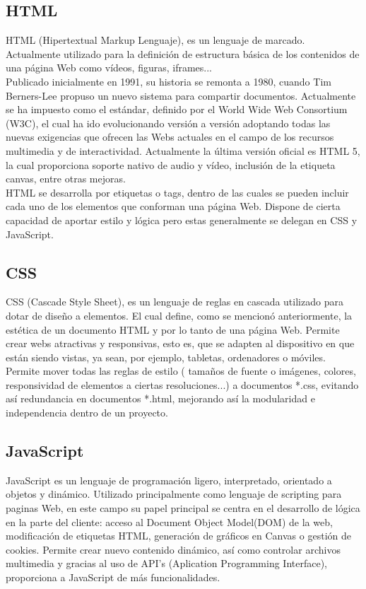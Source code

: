 \documentclass[11pt,a4paper]{book}
\begin{document}
			\subsection{HTML}
				HTML (Hipertextual Markup Lenguaje), es un lenguaje de marcado. Actualmente utilizado para la definición de  estructura básica de los contenidos de una página Web como vídeos, figuras, iframes... \\
				
				Publicado inicialmente en 1991, su historia se remonta a 1980, cuando Tim Berners-Lee propuso un nuevo sistema para compartir documentos. Actualmente se ha impuesto como el estándar, definido por el World Wide Web Consortium (W3C), el cual ha ido evolucionando versión a versión adoptando todas las nuevas exigencias que ofrecen las Webs actuales en el campo de los recursos multimedia y de interactividad. Actualmente la última versión oficial es HTML 5, la cual proporciona soporte nativo de audio y vídeo, inclusión de la etiqueta canvas, entre otras mejoras.\\
				
				HTML se desarrolla por etiquetas o tags, dentro de las cuales se pueden incluir cada uno de los elementos que conforman una página Web. Dispone de cierta capacidad de aportar estilo y lógica pero estas generalmente se delegan en CSS y JavaScript.
			\subsection{CSS}
				CSS (Cascade Style Sheet), es un lenguaje de reglas en cascada utilizado para dotar de diseño a elementos. El cual define, como se mencionó anteriormente, la estética de un documento HTML y por lo tanto de una página Web. Permite crear webs atractivas y responsivas, esto es, que se adapten al dispositivo en que están siendo vistas, ya sean, por ejemplo, tabletas, ordenadores o móviles.\\
				
				Permite mover todas las reglas de estilo
				( tamaños de fuente o imágenes, colores, responsividad de elementos a ciertas resoluciones...) a documentos *.css, evitando así redundancia en documentos *.html, mejorando así la modularidad e independencia dentro de un proyecto.
			\subsection{JavaScript}
				JavaScript es un lenguaje de programación ligero, interpretado, orientado a objetos y dinámico. Utilizado principalmente como lenguaje de scripting para paginas Web, en este campo su papel principal se centra en el desarrollo de lógica en la parte del cliente: acceso al Document Object Model(DOM) de la web, modificación de etiquetas HTML, generación de gráficos en Canvas o gestión de cookies.
				Permite crear nuevo contenido dinámico, así como controlar archivos multimedia y gracias al uso de API's (Aplication Programming Interface), proporciona a JavaScript de más funcionalidades.
				
\end{document}
